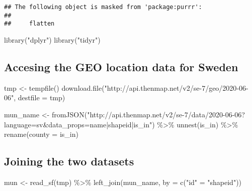 \documentclass[
]{article}
\newenvironment{Shaded}{\begin{snugshade}}{\end{snugshade}}
\newcommand{\AttributeTok}[1]{\textcolor[rgb]{0.77,0.63,0.00}{#1}}
\newcommand{\FunctionTok}[1]{\textcolor[rgb]{0.00,0.00,0.00}{#1}}
\newcommand{\NormalTok}[1]{#1}
\newcommand{\OtherTok}[1]{\textcolor[rgb]{0.56,0.35,0.01}{#1}}
\newcommand{\SpecialCharTok}[1]{\textcolor[rgb]{0.00,0.00,0.00}{#1}}
\newcommand{\StringTok}[1]{\textcolor[rgb]{0.31,0.60,0.02}{#1}}
\begin{document}
\begin{verbatim}
## The following object is masked from 'package:purrr':
## 
##     flatten
\end{verbatim}

\begin{Shaded}
\begin{Highlighting}[]
\FunctionTok{library}\NormalTok{(}\StringTok{"dplyr"}\NormalTok{) }
\FunctionTok{library}\NormalTok{(}\StringTok{"tidyr"}\NormalTok{)}
\end{Highlighting}
\end{Shaded}

\hypertarget{accesing-the-geo-location-data-for-sweden}{%
\subsection{Accesing the GEO location data for
Sweden}\label{accesing-the-geo-location-data-for-sweden}}

\begin{Shaded}
\begin{Highlighting}[]
\NormalTok{tmp }\OtherTok{\textless{}{-}} \FunctionTok{tempfile}\NormalTok{()}
\FunctionTok{download.file}\NormalTok{(}\StringTok{"http://api.thenmap.net/v2/se{-}7/geo/2020{-}06{-}06"}\NormalTok{, }\AttributeTok{destfile =}\NormalTok{ tmp)}

\NormalTok{mun\_name }\OtherTok{\textless{}{-}} \FunctionTok{fromJSON}\NormalTok{(}\StringTok{"http://api.thenmap.net/v2/se{-}7/data/2020{-}06{-}06?language=sv\&data\_props=name|shapeid|is\_in"}\NormalTok{) }\SpecialCharTok{\%\textgreater{}\%} 
  \FunctionTok{unnest}\NormalTok{(is\_in) }\SpecialCharTok{\%\textgreater{}\%} 
  \FunctionTok{rename}\NormalTok{(}\AttributeTok{county =}\NormalTok{ is\_in)}
\end{Highlighting}
\end{Shaded}

\hypertarget{joining-the-two-datasets}{%
\subsection{Joining the two datasets}\label{joining-the-two-datasets}}

\begin{Shaded}
\begin{Highlighting}[]
\NormalTok{mun }\OtherTok{\textless{}{-}} \FunctionTok{read\_sf}\NormalTok{(tmp) }\SpecialCharTok{\%\textgreater{}\%} 
  \FunctionTok{left\_join}\NormalTok{(mun\_name, }\AttributeTok{by =} \FunctionTok{c}\NormalTok{(}\StringTok{"id"} \OtherTok{=} \StringTok{"shapeid"}\NormalTok{)) }
\end{Highlighting}
\end{Shaded}
\end{document}
